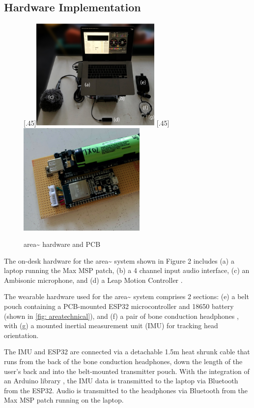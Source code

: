 \subsection{Hardware Implementation}            \label{sec: area-system-hardware}
\begin{figure}
    \centering
    \subcaptionbox*{}[.45\textwidth]{\includegraphics[height=5.5cm]{figures/05-area/areatechnical_hardware.png}}%
    \hfill
    \subcaptionbox*{}[.45\textwidth]{\includegraphics[height=5.5cm]{figures/05-area/areatechnical_pcb.png}}%
    \caption{area\textasciitilde{} hardware and PCB}
    \label{fig: areatechnical}
\end{figure}

The on-desk hardware for the area\textasciitilde{} system shown in Figure 2 includes (a) a laptop running the Max MSP \citep{cycling742020} patch, (b) a 4 channel input audio interface, (c) an Ambisonic microphone, and (d) a Leap Motion Controller \citep{ultraleap2020}.

The wearable hardware used for the area\textasciitilde{} system comprises 2 sections: (e) a belt pouch containing a PCB-mounted ESP32 microcontroller \citep{espressif2020} and 18650 battery (shown in \autoref{fig: areatechnical}), and (f) a pair of bone conduction headphones \citep{aftershokz2020}, with (g) a mounted inertial measurement unit (IMU) for tracking head orientation. 

The IMU and ESP32 are connected via a detachable 1.5m heat shrunk cable that runs from the back of the bone conduction headphones, down the length of the user's back and into the belt-mounted transmitter pouch. With the integration of an Arduino library \citep{winer2016}, the IMU data is transmitted to the laptop via Bluetooth from the ESP32. Audio is transmitted to the headphones via Bluetooth from the Max MSP patch running on the laptop. 

